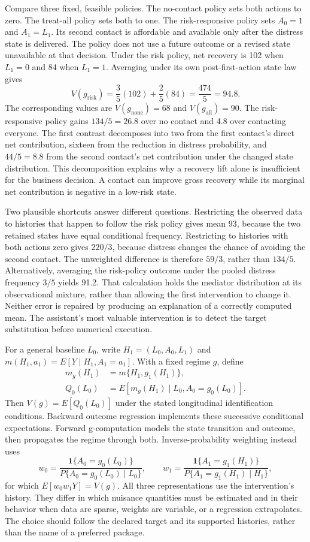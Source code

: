 Compare three fixed, feasible policies. The no-contact policy sets both
actions to zero. The treat-all policy sets both to one. The risk-responsive
policy sets $A_0=1$ and $A_1=L_1$. Its second contact is affordable and available
only after the distress state is delivered. The policy does not use a future
outcome or a revised state unavailable at that decision. Under the risk policy,
net recovery is 102 when $L_1=0$ and 84 when $L_1=1$. Averaging under its own
post-first-action state law gives
\[
 V(g_{\mathrm{risk}})=\frac35(102)+\frac25(84)
 =\frac{474}{5}=94.8.
\]
The corresponding values are $V(g_{\mathrm{none}})=68$ and
$V(g_{\mathrm{all}})=90$. The risk-responsive policy gains
$134/5=26.8$ over no contact and 4.8 over contacting everyone. The first contrast
decomposes into two from the first contact's direct net contribution, sixteen
from the reduction in distress probability, and $44/5=8.8$ from the second
contact's net contribution under the changed state distribution. This
decomposition explains why a recovery lift alone is insufficient for the
business decision. A contact can improve gross recovery while its marginal
net contribution is negative in a low-risk state.

Two plausible shortcuts answer different questions. Restricting the observed
data to histories that happen to follow the risk policy gives mean 93, because
the two retained states have equal conditional frequency. Restricting to
histories with both actions zero gives $220/3$, because distress changes the
chance of avoiding the second contact. The unweighted difference is therefore
$59/3$, rather than $134/5$. Alternatively, averaging the risk-policy outcome
under the pooled distress frequency $3/5$ yields 91.2. That calculation holds
the mediator distribution at its observational mixture, rather than allowing
the first intervention to change it. Neither error is repaired by producing
an explanation of a correctly computed mean. The assistant's most valuable
intervention is to detect the target substitution before numerical execution.

For a general baseline $L_0$, write
$H_1=(L_0,A_0,L_1)$ and
$m(H_1,a_1)=E[Y\mid H_1,A_1=a_1]$. With a fixed regime $g$, define
\begin{align*}
 m_g(H_1)&=m\{H_1,g_1(H_1)\},\\
 Q_0(L_0)&=E[m_g(H_1)\mid L_0,A_0=g_0(L_0)].
\end{align*}
Then $V(g)=E[Q_0(L_0)]$ under the stated longitudinal identification
conditions. Backward outcome regression implements these successive
conditional expectations. Forward g-computation models the state transition
and outcome, then propagates the regime through both. Inverse-probability
weighting instead uses
\[
 w_0=\frac{\mathbf1\{A_0=g_0(L_0)\}}
 {P\{A_0=g_0(L_0)\mid L_0\}},\qquad
 w_1=\frac{\mathbf1\{A_1=g_1(H_1)\}}
 {P\{A_1=g_1(H_1)\mid H_1\}},
\]
for which $E[w_0w_1Y]=V(g)$. All three representations use the intervention's
history. They differ in which nuisance quantities must be estimated and in
their behavior when data are sparse, weights are variable, or a regression
extrapolates. The choice should follow the declared target and its supported
histories, rather than the name of a preferred package.

